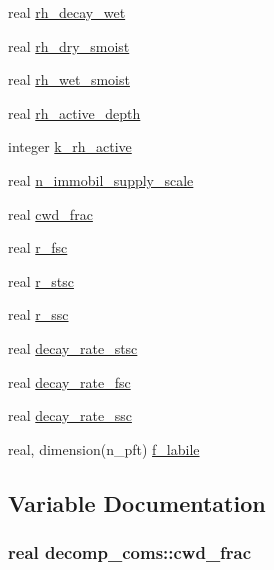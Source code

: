 \begin{DoxyCompactItemize}
\item 
real \hyperlink{namespacedecomp__coms_a49939319c35a32768b1106977d01b956}{rh\+\_\+decay\+\_\+wet}
\item 
real \hyperlink{namespacedecomp__coms_a376a5f59af3fff1df41ee2526e12d770}{rh\+\_\+dry\+\_\+smoist}
\item 
real \hyperlink{namespacedecomp__coms_a44a77512c0fb885ba9e4466402acd9c7}{rh\+\_\+wet\+\_\+smoist}
\item 
real \hyperlink{namespacedecomp__coms_a341e2649f9bd1e218c98505c0b7ce787}{rh\+\_\+active\+\_\+depth}
\item 
integer \hyperlink{namespacedecomp__coms_ad0a2f36f4bb43093696721e09df4a9e9}{k\+\_\+rh\+\_\+active}
\item 
real \hyperlink{namespacedecomp__coms_a75e582cc925b90448eed4ff7320fce15}{n\+\_\+immobil\+\_\+supply\+\_\+scale}
\item 
real \hyperlink{namespacedecomp__coms_a98eb32e300e06da7e5f6f8c75cdf1b01}{cwd\+\_\+frac}
\item 
real \hyperlink{namespacedecomp__coms_a0bef042050b97eeb7d14266674efd4fd}{r\+\_\+fsc}
\item 
real \hyperlink{namespacedecomp__coms_a632207b6b921ec9332d72826f6f92425}{r\+\_\+stsc}
\item 
real \hyperlink{namespacedecomp__coms_a039995e3414a2ec7fbabdb27f801425b}{r\+\_\+ssc}
\item 
real \hyperlink{namespacedecomp__coms_a6e61ed0b816c5e67c3163a235644aa5f}{decay\+\_\+rate\+\_\+stsc}
\item 
real \hyperlink{namespacedecomp__coms_afb3b626ea1538ffe9fda37c6be99fd2e}{decay\+\_\+rate\+\_\+fsc}
\item 
real \hyperlink{namespacedecomp__coms_a4f019556e7a13ea97a848a68f8aea865}{decay\+\_\+rate\+\_\+ssc}
\item 
real, dimension(n\+\_\+pft) \hyperlink{namespacedecomp__coms_a073b9f7c8ba7d2817a8b7fb32737d871}{f\+\_\+labile}
\end{DoxyCompactItemize}


\subsection{Variable Documentation}
\hypertarget{namespacedecomp__coms_a98eb32e300e06da7e5f6f8c75cdf1b01}{}
\subsubsection[{cwd\+\_\+frac}]{\setlength{\rightskip}{0pt plus 5cm}real decomp\+\_\+coms\+::cwd\+\_\+frac}\label{namespacedecomp__coms_a98eb32e300e06da7e5f6f8c75cdf1b01}
\hypertarget{namespacedecomp__coms_afb3b626ea1538ffe9fda37c6be99fd2e}{}
